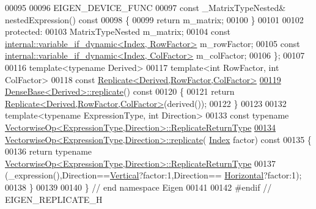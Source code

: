 \begin{DoxyCode}
00095 
00096     EIGEN\_DEVICE\_FUNC
00097     \textcolor{keyword}{const} \_MatrixTypeNested& nestedExpression()\textcolor{keyword}{ const}
00098 \textcolor{keyword}{    }\{ 
00099       \textcolor{keywordflow}{return} m\_matrix; 
00100     \}
00101 
00102   \textcolor{keyword}{protected}:
00103     MatrixTypeNested m\_matrix;
00104     \textcolor{keyword}{const} \hyperlink{class_eigen_1_1internal_1_1variable__if__dynamic}{internal::variable\_if\_dynamic<Index, RowFactor>} 
      m\_rowFactor;
00105     \textcolor{keyword}{const} \hyperlink{class_eigen_1_1internal_1_1variable__if__dynamic}{internal::variable\_if\_dynamic<Index, ColFactor>} 
      m\_colFactor;
00106 \};
00107 
00116 \textcolor{keyword}{template}<\textcolor{keyword}{typename} Derived>
00117 \textcolor{keyword}{template}<\textcolor{keywordtype}{int} RowFactor, \textcolor{keywordtype}{int} ColFactor>
00118 \textcolor{keyword}{const} \hyperlink{group___core___module_class_eigen_1_1_replicate}{Replicate<Derived,RowFactor,ColFactor>}
\hyperlink{group___core___module_a60dadfe80b813d808e91e4521c722a8e}{00119} \hyperlink{group___core___module_class_eigen_1_1_dense_base}{DenseBase<Derived>::replicate}()\textcolor{keyword}{ const}
00120 \textcolor{keyword}{}\{
00121   \textcolor{keywordflow}{return} \hyperlink{group___core___module_class_eigen_1_1_replicate}{Replicate<Derived,RowFactor,ColFactor>}(derived());
00122 \}
00123 
00132 \textcolor{keyword}{template}<\textcolor{keyword}{typename} ExpressionType, \textcolor{keywordtype}{int} Direction>
00133 \textcolor{keyword}{const} \textcolor{keyword}{typename} \hyperlink{group___core___module_class_eigen_1_1_replicate}{VectorwiseOp<ExpressionType,Direction>::ReplicateReturnType}
\hyperlink{group___core___module_a5f0c8dc9e9c4aeaa2057f15800f5c18c}{00134} \hyperlink{group___core___module_a5f0c8dc9e9c4aeaa2057f15800f5c18c}{VectorwiseOp<ExpressionType,Direction>::replicate}(
      \hyperlink{group___core___module_a4907c654e5810edd98e4162093b19532}{Index} factor)\textcolor{keyword}{ const}
00135 \textcolor{keyword}{}\{
00136   \textcolor{keywordflow}{return} \textcolor{keyword}{typename} \hyperlink{group___core___module_class_eigen_1_1_replicate}{VectorwiseOp<ExpressionType,Direction>::ReplicateReturnType}
00137           (\_expression(),Direction==\hyperlink{group__enums_ggad49a7b3738e273eb00932271b36127f7addca718e0564723df21d61b94b1198be}{Vertical}?factor:1,Direction==
      \hyperlink{group__enums_ggad49a7b3738e273eb00932271b36127f7aae8a16b3b9272683c1162915f6d892be}{Horizontal}?factor:1);
00138 \}
00139 
00140 \} \textcolor{comment}{// end namespace Eigen}
00141 
00142 \textcolor{preprocessor}{#endif // EIGEN\_REPLICATE\_H}
\end{DoxyCode}
